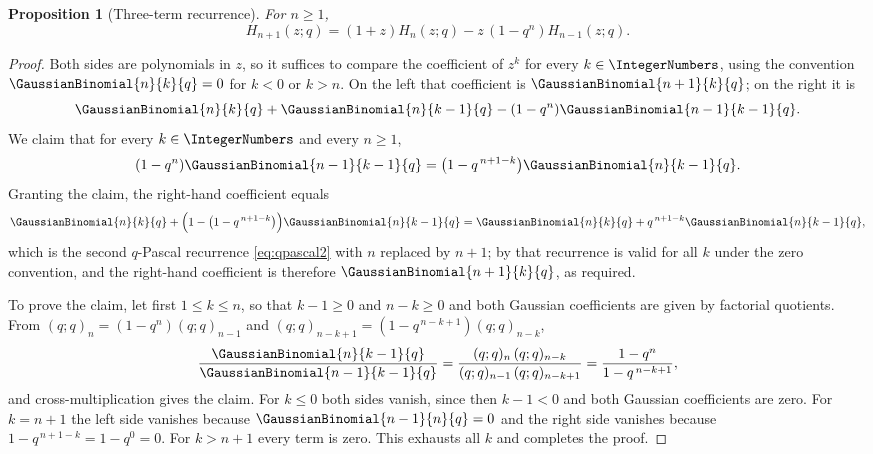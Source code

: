 \documentclass[11pt,a4paper,oneside,openany]{book}
\newtheorem{proposition}[proposition]{Proposition}
\theoremstyle{definition}
\theoremstyle{remark}
\begin{document}
\begin{proposition}[Three-term recurrence]\label{prop:rogers-szego-three-term}
For $n\ge1$,
\[
 H_{n+1}(z;q)=(1+z)H_n(z;q)-z\,(1-q^n)H_{n-1}(z;q).
\]
\end{proposition}

\begin{proof}
Both sides are polynomials in $z$, so it suffices to compare the coefficient
of $z^k$ for every $k\in\IntegerNumbers$, using the convention $\GaussianBinomial{n}{k}{q}=0$ for $k<0$ or
$k>n$.  On the left that coefficient is $\GaussianBinomial{n+1}{k}{q}$; on the right it is
\[
 \GaussianBinomial{n}{k}{q}+\GaussianBinomial{n}{k-1}{q}-(1-q^n)\GaussianBinomial{n-1}{k-1}{q}.
\]
We claim that for every $k\in\IntegerNumbers$ and every $n\ge1$,
\[
 (1-q^n)\GaussianBinomial{n-1}{k-1}{q}=\bigl(1-q^{\,n+1-k}\bigr)\GaussianBinomial{n}{k-1}{q}.
\]
Granting the claim, the right-hand coefficient equals
\[
 \GaussianBinomial{n}{k}{q}+\Bigl(1-\bigl(1-q^{\,n+1-k}\bigr)\Bigr)\GaussianBinomial{n}{k-1}{q}
 =\GaussianBinomial{n}{k}{q}+q^{\,n+1-k}\GaussianBinomial{n}{k-1}{q},
\]
which is the second $q$-Pascal recurrence \eqref{eq:qpascal2} with $n$
replaced by $n+1$; by  that recurrence is valid for all $k$
under the zero convention, and the right-hand coefficient is therefore
$\GaussianBinomial{n+1}{k}{q}$, as required.

To prove the claim, let first $1\le k\le n$, so that $k-1\ge0$ and
$n-k\ge0$ and both Gaussian coefficients are given by factorial quotients.
From $(q;q)_n=(1-q^n)(q;q)_{n-1}$ and
$(q;q)_{n-k+1}=(1-q^{\,n-k+1})(q;q)_{n-k}$,
\[
 \frac{\GaussianBinomial{n}{k-1}{q}}{\GaussianBinomial{n-1}{k-1}{q}}
 =\frac{(q;q)_n\,(q;q)_{n-k}}{(q;q)_{n-1}\,(q;q)_{n-k+1}}
 =\frac{1-q^n}{1-q^{\,n-k+1}},
\]
and cross-multiplication gives the claim.  For $k\le0$ both sides vanish,
since then $k-1<0$ and both Gaussian coefficients are zero.  For $k=n+1$ the
left side vanishes because $\GaussianBinomial{n-1}{n}{q}=0$ and the right side vanishes
because $1-q^{\,n+1-k}=1-q^0=0$.  For $k>n+1$ every term is zero.  This
exhausts all $k$ and completes the proof.
\end{proof}
\end{document}
